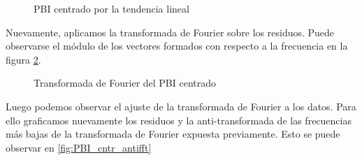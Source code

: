 \documentclass[a4paper]{article}
\begin{document}
\begin{figure}[H]
	\centering
	\caption{PBI centrado por la tendencia lineal} 	
	\label{fig:PBI_cntr}
\end{figure}


Nuevamente, aplicamos la transformada de Fourier sobre los residuos. Puede observarse el módulo de los vectores formados con respecto a la frecuencia en la figura \ref{fig:PBI_cntr_fft}.

\begin{figure}[H]
	\centering
	\caption{Transformada de Fourier del PBI centrado} 	
	\label{fig:PBI_cntr_fft}
\end{figure}

Luego podemos observar el ajuste de la transformada de Fourier a los datos. Para ello graficamos nuevamente los residuos y la anti-transformada de las frecuencias más bajas de la transformada de Fourier expuesta previamente. Esto se puede observar en \ref{fig:PBI_cntr_antifft}
\end{document}
